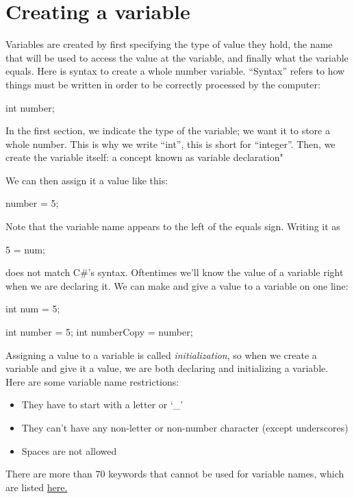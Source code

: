 \documentclass[oneside, openany] {book}
\begin{document}
\section{Creating a variable}
Variables are created by first specifying the type of value they hold, the name that will be used to access the value at the variable, and finally what the variable equals.
Here is syntax to create a whole number variable. “Syntax” refers to how things must be written in order to be correctly processed by the computer:
\begin{CSharp}
int number;
\end{CSharp}
In the first section, we indicate the type of the variable; we  want it to store a whole number. This is why we write “int”, this is short for “integer”. Then, we create the variable itself: a concept known as variable declaration"

We can then assign it a value like this:

\begin{CSharp}
number = 5;
\end{CSharp}
Note that the variable name appears to the left of the equals sign. Writing it as

\begin{CSharp}
5 = num;
\end{CSharp}
does not match C\#'s syntax.
Oftentimes we'll know the value of a variable right when we are declaring it. We can make and give a value to a variable on one line:

\begin{CSharp}
int num = 5;
\end{CSharp}
\begin{CSharp}
int number = 5;
int numberCopy = number;
\end{CSharp}
Assigning a value to a variable is called \emph{initialization}, so when we create a variable and give it a value, we are both declaring and initializing a variable. 
Here are some variable name restrictions:
\begin{itemize}
\item They have to start with a letter or `\_'
\item They can’t have any non-letter or non-number character (except underscores)
\item Spaces are not allowed
\end{itemize}

There are more than 70 keywords that cannot be used for variable names, which are listed \href{https://docs.microsoft.com/en-us/dotnet/csharp/language-reference/keywords/}{here.}
\end{document}

